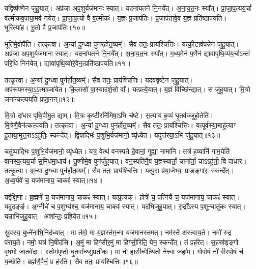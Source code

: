 यद्विष्ष॑ण्णेन जुहु॒यात्।
अप्र॑जा अप॒शुर्यज॑मानः स्यात्।
यदना॑यतने नि॒नये᳚त्।
अ॒ना॒य॒त॒नः स्या᳚त्।
प्रा॒जा॒प॒त्यय॒र्चा व॑ल्मीकव॒पाया॒मव॑ नयेत्।
प्रा॒जा॒प॒त्यो वै व॒ल्मीकः॑।
य॒ज्ञः प्र॒जा\-प॑तिः।
प्र॒जा\-प॑तावे॒व य॒ज्ञं प्रति॑\-ष्ठापयति।
भूरित्या॑ह।
भू॒तो वै प्र॒जा\-प॑तिः॥१०॥

भूति॑मे॒वोपै॑ति।
तत्कृ॒त्वा।
अ॒न्यां दु॒ग्ध्वा पुन॑र्‌\mbox{}होत॒व्यम्᳚।
सैव ततः॒ प्राय॑श्चित्तिः।
यत्की॒टाव॑पन्नेन जुहु॒यात्।
अप्र॑जा अप॒शुर्यज॑मानः स्यात्।
यदना॑यतने नि॒नये᳚त्।
अ॒ना॒य॒त॒नः स्या᳚त्।
म॒ध्य॒मेन॑ प॒र्णेन॑ द्यावापृथि॒व्य॑य॒र्चा\-ऽन्तः॑ परि॒धि निन॑येत्।
द्यावा॑पृथि॒व्योरे॒वैन॒त्प्रति॑\-ष्ठापयति॥११॥

तत्कृ॒त्वा।
अ॒न्यां दु॒ग्ध्वा पुन॑र्\mbox{}होत॒व्यम्᳚।
सैव ततः॒ प्राय॑श्चित्तिः।
यदव॑वृष्टेन जुहु॒यात्।
अप॑रूपमस्या॒ऽ॒ऽ॒त्मञ्जा॑येत।
कि॒लासो॑ वा॒स्याद॑र्\mbox{}श॒सो वा᳚।
यत्प्रत्ये॒यात्।
य॒ज्ञं वि\-च्छि॑न्द्यात्।
स जु॑हुयात्।
मि॒त्रो जना᳚न्कल्पयति प्रजा॒नन्॥१२॥

मि॒त्रो दा॑धार पृथि॒वीमु॒त द्याम्।
मि॒त्रः कृ॒ष्टीरनि॑मिषा॒ऽभि च॑ष्टे।
स॒त्याय॑ ह॒व्यं घृ॒तव॑ज्जुहो॒तेति॑।
मि॒त्रेणै॒वैन॑त्कल्पयति।
तत्कृ॒त्वा।
अ॒न्यां दु॒ग्ध्वा पुन॑र्\mbox{}होत॒व्यम्᳚।
सैव ततः॒ प्राय॑श्चित्तिः।
यत्पूर्व॑स्या॒माहु॑त्याꣳ हु॒ताया॒मुत्त॒रा\-ऽऽहु॑तिः॒ स्कन्दे᳚त्।
द्वि॒पाद्भिः॑ प॒शुभि॒र्यज॑मानो॒ व्यृ॑ध्येत।
यदुत्त॑रया॒ऽभि जु॑हु॒यात्॥१३॥

चतु॑ष्पाद्भिः प॒शुभि॒र्यज॑मानो॒ व्यृ॑ध्येत।
यत्र॒ वेत्थ॑ वनस्पते दे॒वानां॒ गुह्या॒ नामा॑नि।
तत्र॑ ह॒व्यानि॑ गाम॒येति॑ वानस्प॒त्यय॒र्चा स॒मिध॑मा॒धाय॑।
तू॒ष्णीमे॒व पुन॑र्जुहुयात्।
वन॒स्पति॑नै॒व य॒ज्ञस्यार्तां॒ चाना᳚र्तां॒ चाऽऽहु॑ती॒ वि दा॑धार।
तत्कृ॒त्वा।
अ॒न्यां दु॒ग्ध्वा पुन॑र्\mbox{}होत॒व्यम्᳚।
सैव ततः॒ प्राय॑श्चित्तिः।
यत्पु॒रा प्र॑या॒जेभ्यः॒ प्राङङ्गा॑रः॒ स्कन्दे᳚त्।
अ॒ध्व॒र्यवे॑ च॒ यज॑मानाय॒ चाकꣴ॑ स्यात्॥१४॥

यद्द॑क्षि॒णा।
ब्र॒ह्मणे॑ च॒ यज॑मानाय॒ चाकꣴ॑ स्यात्।
यत्प्र॒त्यक्।
होत्रे॑ च॒ पत्नि॑यै च॒ यज॑मानाय॒ चाकꣴ॑ स्यात्।
यदुदङ्ङ्॑।
अ॒ग्नीधे॑ च प॒शुभ्य॑श्च॒ यज॑मानाय॒ चाकꣴ॑ स्यात्।
यद॑भिजुहु॒यात्।
रु॒द्रो᳚ऽस्य प॒शून्घातु॑कः स्यात्।
यन्नाभि॑जुहु॒यात्।
अशा᳚न्तः॒ प्रह्रि॑येत॥१५॥

स्रु॒वस्य॒ बुध्ने॑नाभि॒निद॑ध्यात्।
मा त॑मो॒ मा य॒ज्ञस्त॑म॒न्मा यज॑मानस्तमत्।
नम॑स्ते अस्त्वाय॒ते।
नमो॑ रुद्र पराय॒ते।
नमो॒ यत्र॑ नि॒षीद॑सि।
अ॒मुं मा हिꣳ॑सीर॒मुं मा हिꣳ॑सी॒रिति॒ येन॒ स्कन्दे᳚त्।
तं प्रह॑रेत्।
स॒हस्र॑शृङ्गो वृष॒भो जा॒तवे॑दाः।
स्तोम॑पृष्ठो घृ॒तवा᳚न्थ्सु॒प्रती॑कः।
मा नो॑ हासीन्मेत्थि॒तो नेत्त्वा॒ जहा॑म।
गो॒पो॒षं नो॑ वीरपो॒षं च॑ य॒च्छेति॑।
ब्रह्म॑णै॒वैनं॒ प्र ह॑रति।
सैव ततः॒ प्राय॑श्चित्तिः॥१६॥

